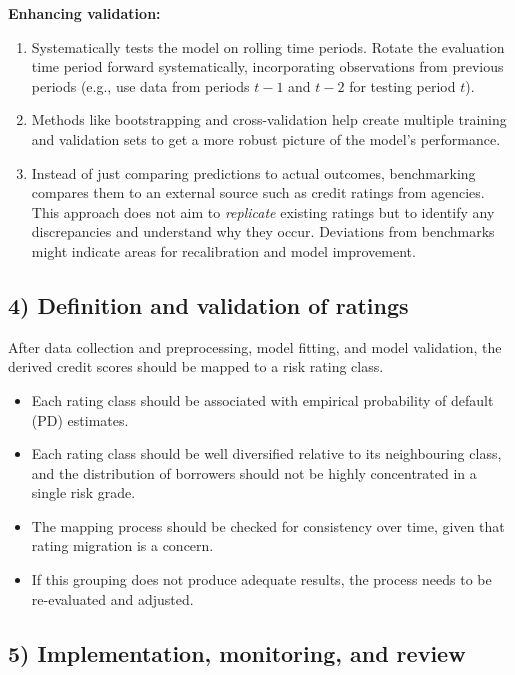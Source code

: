 \textbf{Enhancing validation:}

\begin{enumerate}
\item {} Systematically tests the model on rolling time
periods. Rotate the evaluation time period forward systematically, incorporating
observations from previous periods (e.g., use data from periods $t-1$ and $t-2$
for testing period $t$).
\item {} Methods like bootstrapping and
cross-validation help create multiple training and validation sets to get a more
robust picture of the model's performance.
\item {} Instead of just comparing predictions to actual
outcomes, benchmarking compares them to an external source such as credit ratings
from agencies. This approach does not aim to \emph{replicate} existing ratings
but to identify any discrepancies and understand why they occur. Deviations from
benchmarks might indicate areas for recalibration and model improvement.
\end{enumerate}

\subsection*{4) Definition and validation of ratings}

After data collection and preprocessing, model fitting, and model validation, the
derived credit scores should be mapped to a risk rating class.

\begin{itemize}
\item Each rating class should be associated with empirical probability of
default (PD) estimates.
\item Each rating class should be well diversified relative to its neighbouring
class, and the distribution of borrowers should not be highly concentrated in a
single risk grade.
\item The mapping process should be checked for consistency over time, given that
rating migration is a concern.
\item If this grouping does not produce adequate results, the process needs to be
re-evaluated and adjusted.
\end{itemize}

\subsection*{5) Implementation, monitoring, and review}

